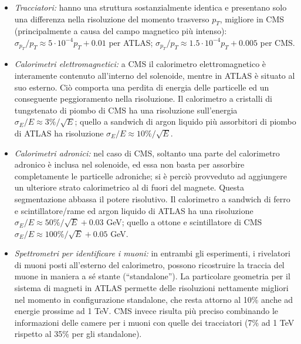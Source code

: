 \begin{itemize}
\item {\itshape Tracciatori:} hanno una struttura sostanzialmente identica e presentano solo una differenza nella risoluzione del momento trasverso $p_T$, migliore in CMS (principalmente a causa del campo magnetico pi\`u intenso): $\sigma_{p_T}/p_T \approx 5 \cdot 10^{-4} p_T + 0.01$ per ATLAS; $\sigma_{p_T}/p_T \approx 1.5 \cdot 10^{-4} p_T + 0.005$ per CMS.
\item {\itshape Calorimetri elettromagnetici:} a CMS il calorimetro elettromagnetico \`e interamente contenuto all'interno del solenoide, mentre in ATLAS \`e situato al suo esterno. Ci\`o comporta una perdita di energia delle particelle ed un conseguente peggioramento nella risoluzione. Il calorimetro a cristalli di tungstenato di piombo di CMS ha una risoluzione sull'energia $\sigma_E /E \approx 3\%/\sqrt{E}$; quello a sandwich di argon liquido pi\`u assorbitori di piombo di ATLAS ha risoluzione $\sigma_E / E \approx 10\%/\sqrt{E}$.
\item {\itshape Calorimetri adronici:} nel caso di CMS, soltanto una parte del calorimetro adronico \`e inclusa nel solenoide, ed essa non basta per assorbire completamente le particelle adroniche; si \`e perci\`o provveduto ad aggiungere un ulteriore strato calorimetrico al di fuori del magnete. Questa segmentazione abbassa il potere risolutivo. Il calorimetro a sandwich di ferro e scintillatore/rame ed argon liquido di ATLAS ha una risoluzione $\sigma_E /E \approx 50\%/\sqrt{E} + 0.03$ GeV; quello a ottone e scintillatore di CMS $\sigma_E /E \approx 100\%/\sqrt{E} + 0.05$ GeV.
\item {\itshape Spettrometri per identificare i muoni:} in entrambi gli esperimenti, i rivelatori di muoni posti all'esterno del calorimetro, possono ricostruire la traccia del muone in maniera a s\'e stante (``standalone''). La particolare geometria per il sistema di magneti in ATLAS permette delle risoluzioni nettamente migliori nel momento in configurazione standalone, che resta attorno al 10\% anche ad energie prossime ad 1 TeV. CMS invece risulta pi\`u preciso combinando le informazioni delle camere per i muoni con quelle dei tracciatori (7\% ad 1 TeV rispetto al 35\% per gli standalone).
\end{itemize}
